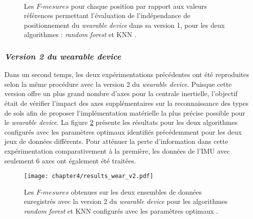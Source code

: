 \begin{figure}[H]
  \centering
{}
  \\[20pt]
  \caption[Les $F\mbox{-} mesures$ pour chaque position par rapport aux valeurs références permettant l'évaluation de l'indépendance de positionnement du \textit{wearable device} dans sa version 1, pour les deux algorithmes : \textit{random forest} et \acs{KNN}.]{Les $F\mbox{-} mesures$ pour chaque position par rapport aux valeurs références permettant l'évaluation de l'indépendance de positionnement du \textit{wearable device} dans sa version 1, pour les deux algorithmes : \textit{random forest} et \acs{KNN} \citep{Thullier2017}.}
  \label{fig:pos_ind_wear_v1}
\end{figure}


\subsubsection{\textit{Version 2 du wearable device}}

Dans un second temps, les deux expérimentations précédentes ont été reproduites selon la même procédure avec la version 2 du \textit{wearable device}. Puisque cette version offre un plus grand nombre d'axes pour la centrale inertielle, l'objectif était de vérifier l'impact des axes supplémentaires sur la reconnaissance des types de sols afin de proposer l'implémentation matérielle la plus précise possible pour le \textit{wearable device}. La figure \ref{fig:results_wear_v2} présente les résultats pour les deux algorithmes configurés avec les paramètres optimaux identifiés précédemment pour les deux jeux de données différents. Pour atténuer la perte d'information dans cette expérimentation comparativement à la première, les données de l'\acs{IMU} avec seulement 6 axes ont également été traitées.

\begin{figure}[H]
	\centering
	\texttt{[image: chapter4/results\_wear\_v2.pdf]}
        \caption[Les $F\mbox{-} mesures$ obtenues sur les deux ensembles de données enregistrés avec la version 2 du \textit{wearable device} pour les algorithmes \textit{random forest} et \acs{KNN} configurés avec les paramètres optimaux.]{Les $F\mbox{-} mesures$ obtenues sur les deux ensembles de données enregistrés avec la version 2 du \textit{wearable device} pour les algorithmes \textit{random forest} et \acs{KNN} configurés avec les paramètres optimaux \citep{Thullier2017}.}
	\label{fig:results_wear_v2}
\end{figure}

